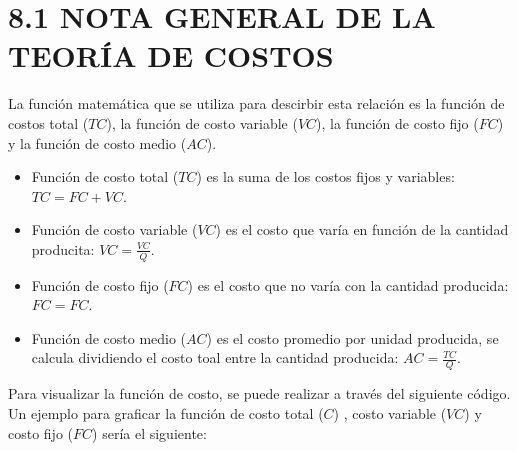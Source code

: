 \documentclass[
  spanish,
  12pt,
]{book}
\providecommand{\tightlist}{%
  \setlength{\itemsep}{0pt}\setlength{\parskip}{0pt}}
\begin{document}
\newpage

\section{8.1 NOTA GENERAL DE LA TEORÍA DE
COSTOS}\label{nota-general-de-la-teoruxeda-de-costos}

La función matemática que se utiliza para descirbir esta relación es la
función de costos total (\(TC\)), la función de costo variable (\(VC\)),
la función de costo fijo (\(FC\)) y la función de costo medio (\(AC\)).

\begin{itemize}
\tightlist
\item
  Función de costo total (\(TC\)) es la suma de los costos fijos y
  variables: \(TC = FC +  VC\).
\item
  Función de costo variable (\(VC\)) es el costo que varía en función de
  la cantidad producita: \(VC = \frac{VC}{Q}\).
\item
  Función de costo fijo (\(FC\)) es el costo que no varía con la
  cantidad producida: \(FC = FC\).
\item
  Función de costo medio (\(AC\)) es el costo promedio por unidad
  producida, se calcula dividiendo el costo toal entre la cantidad
  producida: \(AC = \frac{TC}{Q}\).
\end{itemize}

Para visualizar la función de costo, se puede realizar a través del
siguiente código. Un ejemplo para graficar la función de costo total
(\(C\)) , costo variable (\(VC\)) y costo fijo (\(FC\)) sería el
siguiente:
\end{document}
